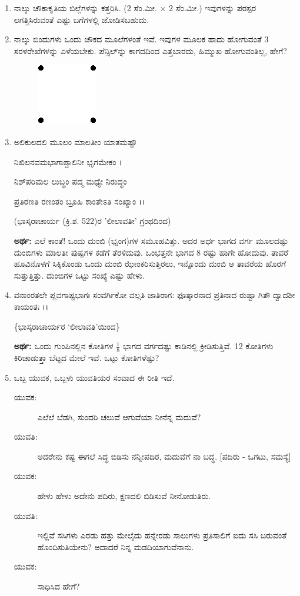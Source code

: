 \begin{enumerate}
\item ನಾಲ್ಕು ಚೌಕಾಕೃತಿಯ ಬಿಲ್ಲೆಗಳನ್ನು ಕತ್ತರಿಸಿ. (2 ಸೆಂ.ಮೀ. $\times$ 2 ಸೆಂ.ಮೀ.) ಇವುಗಳನ್ನು ಪರಸ್ಪರ ಲಗತ್ತಿಸಿರುವಂತೆ ಎಷ್ಟು ಬಗೆಗಳಲ್ಲಿ ಜೋಡಿಸಬಹುದು.

\item ನಾಲ್ಕು ಬಿಂದುಗಳು ಒಂದು ಚೌಕದ ಮೂಲೆಗಳಂತೆ ಇವೆ. ಇವುಗಳ ಮೂಲಕ ಹಾದು ಹೋಗುವಂತೆ 3 ಸರಳರೇಖೆಗಳನ್ನು ಎಳೆಯಬೇಕು. ಪೆನ್ಸಿಲ್‌ನ್ನು  ಕಾಗದದಿಂದ ಎತ್ತಬಾರದು, ಹಿಮ್ಮುಖ ಹೋಗುವಂತಿಲ್ಲ, ಹೇಗೆ? 
\begin{figure}[H]
\centering
\includegraphics{images/chap1/q19.eps}
\end{figure}

\item ಅಲಿಕುಲದಲಿ ಮೂಲಂ ಮಾಲತೀಂ ಯಾತಮಷ್ಟೌ 

ನಿಖಿಲನವಮಭಾಗಾಶ್ಚಾಲಿನೀ ಭೃಗಮೇಕಂ ।

ನಿಶ್‌ಪರಿಮಲ ಲುಬ್ಧಂ ಪದ್ಮ ಮಧ್ಯೇ ನಿರುದ್ಧಂ

ಪ್ರತಿರಣತಿ ರಣಂತಂ ಬ್ರೂಹಿ ಕಾಂತೇಽತಿ ಸಂಖ್ಯಾಂ ।।

\hfill (ಭಾಸ್ಕರಾಚಾರ್ಯ (ಕ್ರಿ.ಶ. 522)ರ 'ಲೀಲಾವತೀ' ಗ್ರಂಥದಿಂದ)

\medskip

{\bf ಅರ್ಥ:} ಎಲೆ ಕಾಂತೆ! ಒಂದು ದುಂಬಿ (ಭೃಂಗ)ಗಳ ಸಮೂಹವಿತ್ತು. ಅದರ ಅರ್ಧ ಭಾಗದ ವರ್ಗ ಮೂಲದಷ್ಟು ದುಂಬಿಗಳು ಮಾಲತೀ ಪುಷ್ಪಗಳ ಕಡೆಗೆ ತೆರಳಿದುವು. ಒಂಭತ್ತನೇ ಭಾಗದ 8 ರಷ್ಟು ಹಾಗೇ ಹೋದುವು. ತಾವರೆ ಹೂವಿನೊಳಗೆ ಸಿಕ್ಕಿಕೊಂಡು ಒಂದು ದುಂಬಿ ಝೇಂಕರಿಸುತ್ತಿರಲು, ಇನ್ನೊಂದು ದುಂಬಿ ಆ ತಾವರೆಯ ಹೊರಗೆ ಸುತ್ತುತ್ತಿತ್ತು. ದುಂಬಿಗಳ ಒಟ್ಟು ಸಂಖ್ಯೆ ಎಷ್ಟು ಹೇಳು.

\eject

\item ವನಾಂರತಲೇ ಪ್ಲವಗಾಷ್ಟಭಾಗಃ ಸಂವರ್ಗಿಕೋ ವಲ್ಗತಿ ಜಾತಿರಾಗ: ಫೂತ್ಕಾರನಾದ ಪ್ರತಿನಾದ ರುಷ್ಟಾ ಗಿತೌ ದ್ವಾದಶೀ ಕಾಯಂತಃ ।।

\hfill \{ಭಾಸ್ಕರಾಚಾರ್ಯರ `ಲೀಲಾವತಿ'ಯಿಂದ\}

{\bf ಅರ್ಥ:} ಒಂದು ಗುಂಪಿನಲ್ಲಿನ ಕೋತಿಗಳ $\frac{1}{8}$ ಭಾಗದ ವರ್ಗದಷ್ಟು ಕಾಡಿನಲ್ಲಿ ಕ್ರೀಡಿಸುತ್ತಿವೆ. 12 ಕೋತಿಗಳು ಕಿರಿಚಾಡುತ್ತಾ ಬೆಟ್ಟದ ಮೇಲೆ ಇವೆ. ಒಟ್ಟು ಕೋತಿಗಳೆಷ್ಟು?

\item ಒಬ್ಬ ಯುವಕ, ಒಬ್ಬಳು ಯುವತಿಯರ ಸಂವಾದ ಈ ರೀತಿ ಇದೆ.
\begin{description}
\item[ಯುವಕ:] ಎಲೆಲೆ ಬೆಡಗಿ, ಸುಂದರಿ ಚಲುವೆ ಆಗುವೆಯಾ ನೀನೆನ್ನ ಮದುವೆ?
\item[ಯುವತಿ:] ಅದರೇನು ಕಷ್ಟ ಈಗಲೆ ಸಿದ್ಧ ಬಿಡಿಸು ನನ್ನೀಪದಿರ, ಮದುವೆಗೆ ನಾ ಬದ್ಧ.  [ಪದಿರು - ಒಗಟು, ಸಮಸ್ಯೆ]
\item[ಯುವಕ:] ಹೇಳು ಹೇಳು ಅದೇನು ಪದಿರು, ಕ್ಷಣದಲಿ ಬಿಡಿಸುವೆ ನೀನೋಡುತಿರು. 
\item[ಯುವತಿ:] ಇಲ್ಲಿವೆ ಸಸಿಗಳು ಎರಡು ಹತ್ತು ಮೇಲೈದು ಹನ್ನೇರಡು ಸಾಲುಗಳು ಪ್ರತಿಸಾಲಿಗೆ ಐದು ಸಸಿ ಬರುವಂತೆ ಹೊಂದಿಸುತಿಯೇನು? ಅದಾದರೆ ನಿನ್ನ ಮಡದಿಯಾಗುವೆನಾನು.
\item[ಯುವಕ:] ಸಾಧಿಸಿದ ಹೇಗೆ?
\end{description}


\end{enumerate}
